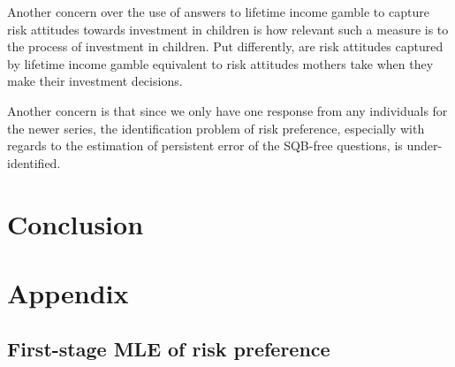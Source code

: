 \documentclass[]{article}
\begin{document}
Another concern over the use of answers to lifetime income gamble to capture risk attitudes towards investment in children is how relevant such a measure is to the process of investment in children. Put differently, are risk attitudes captured by lifetime income gamble equivalent to risk attitudes mothers take when they make their investment decisions.  



Another concern is that since we only have one response from any individuals for the newer series, the identification problem of risk preference, especially with regards to the estimation of persistent error of the SQB-free questions, is under-identified. 




\section{Conclusion}





\pagebreak





\pagebreak

\section{Appendix}
\subsection{First-stage MLE of risk preference}
\end{document}
